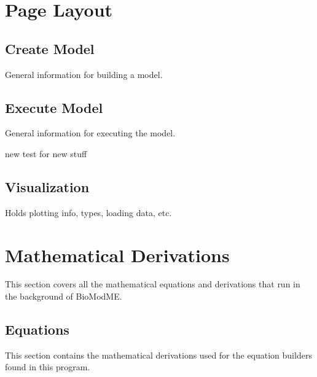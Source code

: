 \documentclass[letterpaper,10pt,english]{sphinxmanual}
\begin{document}
\noindent{}


\chapter{Page Layout}
\label{\detokenize{pages/API_INDEX:page-layout}}\label{\detokenize{pages/API_INDEX::doc}}

\section{Create Model}
\label{\detokenize{pages/api/CreateModel:create-model}}\label{\detokenize{pages/api/CreateModel::doc}}
\sphinxAtStartPar
General information for building a model.


\section{Execute Model}
\label{\detokenize{pages/api/ExecuteModel:execute-model}}\label{\detokenize{pages/api/ExecuteModel::doc}}
\sphinxAtStartPar
General information for executing the model.

\sphinxAtStartPar
new test for new stuff


\section{Visualization}
\label{\detokenize{pages/api/Visualization:visualization}}\label{\detokenize{pages/api/Visualization::doc}}
\sphinxAtStartPar
Holds plotting info, types, loading data, etc.


\chapter{Mathematical Derivations}
\label{\detokenize{pages/BACKEND_MATH_INDEX:mathematical-derivations}}\label{\detokenize{pages/BACKEND_MATH_INDEX::doc}}
\sphinxAtStartPar
This section covers all the mathematical equations and derivations that run in
the background of BioModME.


\section{Equations}
\label{\detokenize{pages/backend/eqn_info_index:equations}}\label{\detokenize{pages/backend/eqn_info_index::doc}}
\sphinxAtStartPar
This section contains the mathematical derivations used for the equation
builders found in this program.
\end{document}
